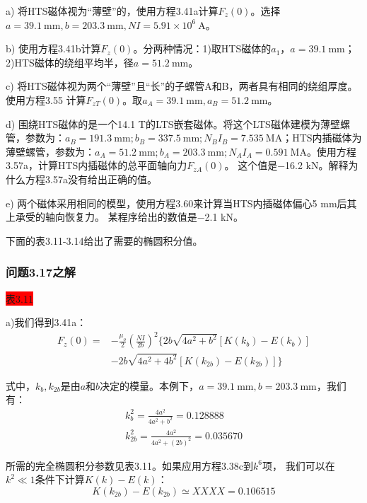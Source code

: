 a) 将HTS磁体视为“薄壁”的，使用方程3.41a计算$F_z(0)$。选择$a=39.1 \ \mathrm{mm}, b=203.3\ \mathrm{mm}, NI =5.91\times 10^6\ \mathrm{A}$。

b) 使用方程3.41b计算$F_z(0)$。分两种情况：1)取HTS磁体的$a_1$，$a=39.1\ \mathrm{mm}$；2)HTS磁体的绕组平均半，径$a=51.2\ \mathrm{mm}$。

c) 将HTS磁体视为两个“薄壁”且“长”的子螺管A和B，两者具有相同的绕组厚度。使用方程3.55
计算$F_{zT}(0)$。取$a_A=39.1\ \mathrm{mm} , a_B=51.2\ \mathrm{mm}$。

d) 围绕HTS磁体的是一个14.1 T的LTS嵌套磁体。将这个LTS磁体建模为薄壁螺管，参数为：$a_B = 191.3\ \mathrm{mm};
b_B= 337.5\ \mathrm{mm}; N_BI_B = 7.535\ \mathrm{MA}$；HTS内插磁体为薄壁螺管，参数为：$a_A = 51.2\ \mathrm{mm}; b_A = 203.3\ \mathrm{mm};
 N_A I_A = 0.591\ \mathrm{MA}$。使用方程3.57a，计算HTS内插磁体的总平面轴向力$F_{zA}(0)$。
 这个值是−16.2 kN。解释为什么方程3.57a没有给出正确的值。

e) 两个磁体采用相同的模型，使用方程3.60来计算当HTS内插磁体偏心5 mm后其上承受的轴向恢复力。
某程序给出的数值是−2.1 kN。

下面的表3.11-3.14给出了需要的椭圆积分值。

\subsubsection{问题3.17之解}
\colorbox{red}{表3.11}

a)我们得到3.41a：
\begin{equation*}
\begin{split}
F_{z}(0)=&-\frac{\mu_{o}}{2}(\frac{NI}{2b})^{2}\{2b\sqrt{4a^{2}+b^{2}}[K(k_{b})-E(k_{b})]\\
&-2b\sqrt{4a^{2}+4b^{2}}[K(k_{2b})-E(k_{2b})]\}%
\end{split}\tag{3.41a}
\end{equation*}

式中，$k_b,k_{2b}$是由$a$和$b$决定的模量。本例下，$a=39.1 \ \mathrm{mm},b=203.3\ \mathrm{mm}$，我们有：
\begin{eqnarray*}
k_b^2=\frac{4a^2}{4a^2+b^2}=0.128888\\
k_{2b}^2=\frac{4a^2}{4a^2+(2b)^2}=0.035670
\end{eqnarray*}

所需的完全椭圆积分参数见表3.11。如果应用方程3.38c到$k^6$项，
我们可以在$k^2\ll 1$条件下计算$ K(k)−E(k)$：
\begin{equation*}
K(k_{2b})-E(k_{2b})\simeq XXXX=0.106515
\end{equation*}

